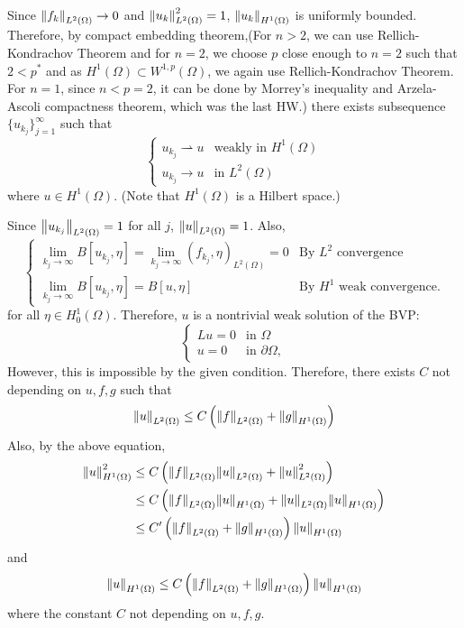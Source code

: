 \documentclass{article}
\begin{document}
Since $\norm{f_k}_{L^2(\Omega)}\rightarrow 0$ and $\norm{u_k}^2_{L^2(\Omega)}=1$, $\norm{u_k}_{H^1(\Omega)}$ is uniformly bounded. Therefore, by compact embedding theorem,(For $n>2$, we can use Rellich-Kondrachov Theorem and for $n=2$, we choose $p$ close enough to $n=2$ such that $2<p^*$ and as $H^1(\Omega)\subset W^{1,p}(\Omega)$, we again use Rellich-Kondrachov Theorem. For $n=1$, since $n<p=2$, it can be done by Morrey's inequality and Arzela-Ascoli compactness theorem, which was the last HW.) there exists subsequence $\{u_{k_j}\}_{j=1}^\infty$ such that
\begin{equation*}
\begin{cases}
u_{k_j}\rightharpoonup u & \text{weakly in }H^1(\Omega) \\
u_{k_j}\rightarrow u & \text{in }L^2(\Omega)
\end{cases}
\end{equation*}
where $u\in H^1(\Omega)$. (Note that $H^1(\Omega)$ is a Hilbert space.)

Since $\norm{u_{k_j}}_{L^2(\Omega)}=1$ for all $j$, $\norm{u}_{L^2(\Omega)}=1$. Also,
\begin{equation*}
\begin{cases}
\lim\limits_{k_j\rightarrow \infty}B[u_{k_j},\eta]=\lim\limits_{k_j\rightarrow \infty}(f_{k_j},\eta)_{L^2(\Omega)}=0 & \text{By }L^2\text{ convergence} \\
\lim\limits_{k_j\rightarrow \infty}B[u_{k_j},\eta]=B[u,\eta] & \text{By }H^1\text{ weak convergence}.
\end{cases}
\end{equation*}
for all $\eta\in H^1_0(\Omega)$. Therefore, $u$ is a nontrivial weak solution of the BVP:
\begin{equation*}
\begin{cases}
Lu=0 & \text{in }\Omega \\
u=0 & \text{in }\partial \Omega,
\end{cases}
\end{equation*}
However, this is impossible by the given condition. Therefore, there exists $C$ not depending on $u, f, g$ such that
\begin{equation*}
\norm{u}_{L^2(\Omega)}\leq C\left(\norm{f}_{L^2(\Omega)}+\norm{g}_{H^1(\Omega)}\right)
\end{equation*}
Also, by the above equation,
\begin{equation*}
\begin{split}
\norm{u}^2_{H^1(\Omega)}&\leq C\left(\norm{f}_{L^2(\Omega)}\norm{u}_{L^2(\Omega)}+\norm{u}^2_{L^2(\Omega)}\right) \\
&\leq C\left(\norm{f}_{L^2(\Omega)}\norm{u}_{H^1(\Omega)}+\norm{u}_{L^2(\Omega)}\norm{u}_{H^1(\Omega)}\right) \\
&\leq C'\left(\norm{f}_{L^2(\Omega)}+\norm{g}_{H^1(\Omega)}\right)\norm{u}_{H^1(\Omega)}
\end{split}
\end{equation*}
and
\begin{equation*}
\norm{u}_{H^1(\Omega)}\leq C\left(\norm{f}_{L^2(\Omega)}+\norm{g}_{H^1(\Omega)}\right)\norm{u}_{H^1(\Omega)}
\end{equation*}
where the constant $C$ not depending on $u,f,g$.
\end{document}
